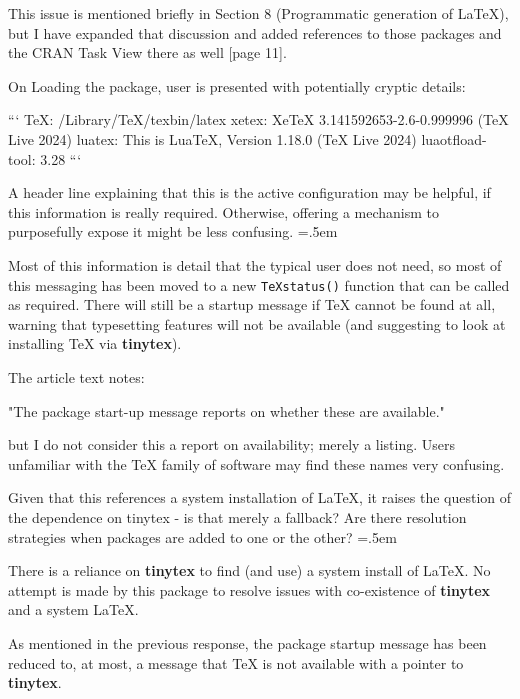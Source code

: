 \documentclass{article}
\newcommand{\code}[1]{\texttt{#1}}
\newenvironment{lcverbatim}
 {\SaveVerbatim{cverb}}
 {\endSaveVerbatim
  \flushleft\fboxrule=0pt\fboxsep=.5em
  \colorbox{cverbbg}{%
    \makebox[\dimexpr\linewidth-2\fboxsep][l]{\BUseVerbatim{cverb}}%
  }
  \endflushleft
}
\begin{document}
This issue is mentioned briefly in Section 8
(Programmatic generation of \LaTeX{}), but I have expanded that discussion
and added references to those
packages and the CRAN Task View there as well [page 11].

\begin{lcverbatim}
  On Loading the package, user is presented with potentially cryptic details:
 
  ```
              TeX:  /Library/TeX/texbin/latex
            xetex:  XeTeX 3.141592653-2.6-0.999996 (TeX Live 2024)
           luatex:  This is LuaTeX, Version 1.18.0 (TeX Live 2024)
  luaotfload-tool:  3.28
  ```

  A header line explaining that this is the active configuration may be helpful,
  if this information is really required. Otherwise, offering a mechanism to
  purposefully expose it might be less confusing.
\end{lcverbatim}

Most of this information is detail that the typical user does not need,
so most of this messaging has been moved to a new \code{TeXstatus()} function
that can be called as required.  There will still be a startup message
if TeX cannot be found at all, warning that typesetting features will
not be available (and suggesting to look at installing \TeX{}
via \textbf{tinytex}).

\begin{lcverbatim}
  The article text notes:

  "The package start-up message reports on whether these are available."

  but I do not consider this a report on availability; merely a listing. Users
  unfamiliar with the TeX family of software may find these names very 
  confusing.

  Given that this references a system installation of LaTeX, it raises the
  question of the dependence on {tinytex} - is that merely a fallback? Are there
  resolution strategies when packages are added to one or the other?
\end{lcverbatim}

There is a reliance on \textbf{tinytex} to find (and use) a system install
of \LaTeX{}.  No attempt is made by this package
to resolve issues with co-existence of
\textbf{tinytex} and a system \LaTeX{}.  

As mentioned in the previous response, the 
package startup message has been reduced to, at most, a message
that \TeX{} is not available with a pointer to \textbf{tinytex}.
\end{document}
